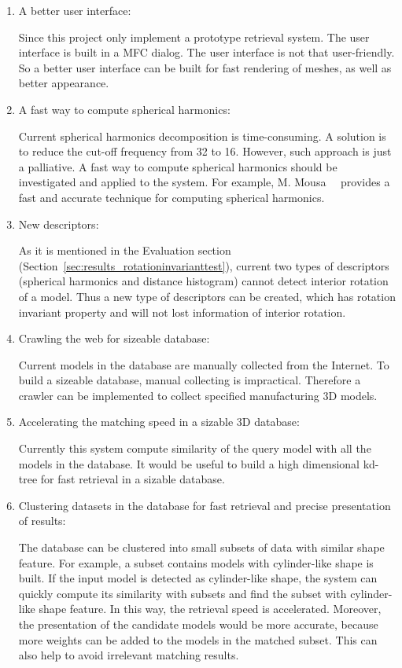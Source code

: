 \begin{enumerate}
\item A better user interface: 

Since this project only implement a prototype retrieval system. The user interface is built in a MFC dialog. The user interface is not that user-friendly. So a better user interface can be built for fast rendering of meshes, as well as better appearance.

\item A fast way to compute spherical harmonics: 

Current spherical harmonics decomposition is time-consuming. A solution is to reduce the cut-off frequency from 32 to 16. However, such approach is just a palliative. A fast way to compute spherical harmonics should be investigated and applied to the system. For example, M. Mousa~\etal~\cite{mousa2006direct} provides a fast and accurate technique for computing spherical
harmonics.

\item New descriptors:

As it is mentioned in the Evaluation section (Section~\ref{sec:results_rotationinvarianttest}), current two types of descriptors (spherical harmonics and distance histogram) cannot detect interior rotation of a model. Thus a new type of descriptors can be created, which has rotation invariant property and will not lost information of interior rotation. 
\item Crawling the web for sizeable database:

Current models in the database are manually collected from the Internet. To build a sizeable database, manual collecting is impractical. Therefore a crawler can be implemented to collect specified manufacturing 3D models.  

\item Accelerating the matching speed in a sizable 3D database: 

Currently this system compute similarity of the query model with all the models in the database. It would be useful to build a high dimensional kd-tree for fast retrieval in a sizable database. 

\item Clustering datasets in the database for fast retrieval and precise presentation of results:

The database can be clustered into small subsets of data with similar shape feature. For example, a subset contains models with cylinder-like shape is built. If the input model is detected as cylinder-like shape, the system can quickly compute its similarity with subsets and find the subset with cylinder-like shape feature. In this way, the retrieval speed is accelerated. Moreover, the presentation of the candidate models would be more accurate, because more weights can be added to the models in the matched subset. This can also help to avoid irrelevant matching results. 

\end{enumerate}